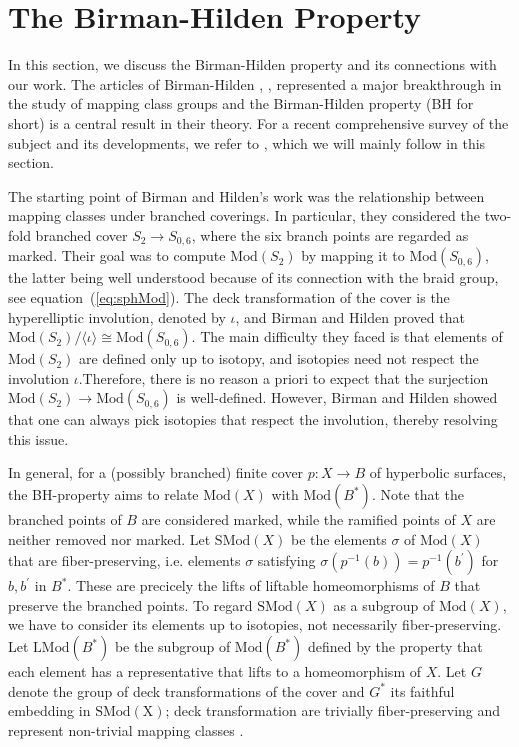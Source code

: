 \documentclass[10pt]{amsart}
\theoremstyle{definition}
\begin{document}
\section{The Birman-Hilden Property}\label{ch:Hilden}
 
In this section, we discuss the Birman-Hilden property and its connections with our work. The articles of Birman-Hilden 
\cite{Birman1971-qj},
\cite{Birman1972-pg},
\cite{Birman1973-ea}  represented a major breakthrough in the study of mapping class groups and the Birman-Hilden property (BH for short) is a central result in their theory.
For a recent comprehensive survey of the subject and its developments, we refer to \cite{MR4275077}, which we will mainly follow in this section.

The starting point of Birman and Hilden’s work was the relationship between mapping classes under branched coverings.
In particular, they considered the two-fold branched cover $S_2\rightarrow S_{0,6}$, where the six branch points are regarded as marked. 
Their goal was to compute $\mathrm{Mod}(S_2)$ by mapping it to $\mathrm{Mod}(S_{0,6})$, the latter being well understood because of its connection with the braid group, see equation~(\ref{eq:sphMod}). 
The deck transformation of the cover is the hyperelliptic involution, denoted by $\iota$, and Birman and Hilden proved that $\mathrm{Mod}(S_2)/\langle \iota \rangle \cong \mathrm{Mod}(S_{0,6})$. The main difficulty they faced is that elements of $\mathrm{Mod}(S_2)$ are defined only up to isotopy, and isotopies need not respect the involution $\iota$.Therefore, there is no reason a priori to expect that the surjection $\mathrm{Mod}(S_2) \rightarrow \mathrm{Mod}(S_{0,6})$ is well-defined. However, Birman and Hilden showed that one can always pick isotopies that respect the involution, thereby resolving this issue.

In general, for a (possibly branched) finite cover $p\colon X\rightarrow B$ of hyperbolic surfaces, the BH-property aims to relate $\mathrm{Mod}(X)$ with $\mathrm{Mod}(B^*)$. Note that the branched points of $B$ are considered marked, while the ramified points of $X$ are neither removed nor marked.
Let $\mathrm{SMod}(X)$ be the elements $\sigma$ of $\mathrm{Mod}(X)$ that are fiber-preserving, i.e. elements $\sigma$ satisfying $\sigma(p^{-1}(b)) = p^{-1}(b^\prime)$ for $b,b^\prime$ in $B^*$. 
These are precicely the lifts of liftable homeomorphisms of $B$ that preserve the branched points. To regard $\mathrm{SMod}(X)$ as a subgroup of $\mathrm{Mod}(X)$, we have to consider its elements up to isotopies, not necessarily fiber-preserving. 
Let $\mathrm{LMod}(B^*)$ be the subgroup of $\mathrm{Mod}(B^*)$ defined by the property that each element has a representative that lifts to a homeomorphism of $X$.
Let $G$ denote the group of deck transformations of the cover and $G^*$ its faithful embedding in $\mathrm{SMod(X)}$; deck transformation are trivially fiber-preserving and represent non-trivial mapping classes \cite{MR4275077}\cite[Prop. 7.7]{FarbMagalit}.
  
\end{document}
